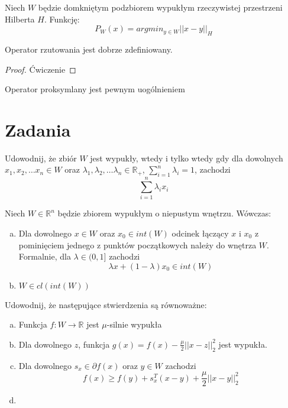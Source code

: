 \documentclass[10pt,a4paper,draft]{report}
\begin{document}
\begin{definition}
Niech $W$ będzie domkniętym podzbiorem wypukłym rzeczywistej przestrzeni Hilberta $H$. Funkcję:
\[
P_W(x) = argmin_{y \in W} ||x - y||_H
\]
\end{definition}
\begin{theorem}
Operator rzutowania jest dobrze zdefiniowany.
\end{theorem}
\begin{proof}
Ćwiczenie
\end{proof}


Operator proksymlany jest pewnym uogólnieniem 


\section{Zadania}
\begin{problem}
Udowodnij, że zbiór $W$ jest wypukły, wtedy i tylko wtedy gdy dla dowolnych $x_1, x_2, \ldots x_n \in W$ oraz $\lambda_1, \lambda_2, \ldots \lambda_n \in \mathbb{R}_+$, $\sum_{i=1}^n \lambda_i = 1$, zachodzi
\[
\sum_{i=1}^n \lambda_i x_i
\]
\end{problem}
\begin{problem}
Niech $W \in \mathbb{R}^n$ będzie zbiorem wypukłym o niepustym wnętrzu. Wówczas:
\begin{enumerate}[a)]

\item Dla dowolnego $x \in W$ oraz $x_0 \in int(W)$ odcinek łączący $x$ i $x_0$ z pominięciem jednego z punktów początkowych należy do wnętrza $W$. Formalnie, dla $\lambda \in (0, 1]$ zachodzi
\[
\lambda x + (1 - \lambda) x_0 \in int(W)
\]

\item $W \in cl(int(W))$
\end{enumerate}
\end{problem}
\begin{problem}
Udowodnij, że następujące stwierdzenia są równoważne:
\begin{enumerate}[a)]
\item Funkcja $f: W \rightarrow \mathbb{R}$ jest $\mu$-silnie wypukła
\item Dla dowolnego $z$, funkcja $g(x) = f(x) - \frac{\mu}{2}||x-z||_2^2$ jest wypukła.
\item Dla dowolnego $s_x \in \partial f(x)$ oraz $y \in W$ zachodzi
\[
f(x) \geq f(y) + s_x^T(x - y) + \frac{\mu}{2} ||x-y||_2^2
\]
\item
\end{enumerate}

\end{problem}
\end{document}
